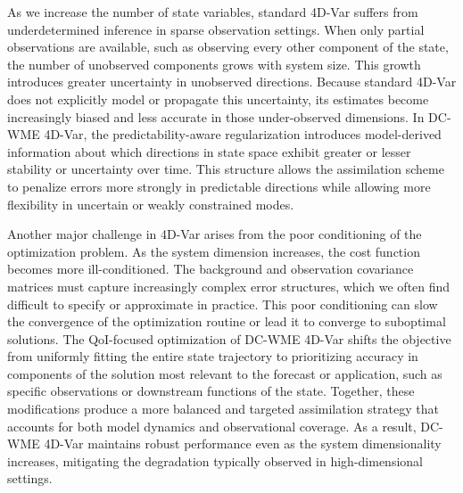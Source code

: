 \documentclass[final,1p,times]{elsarticle}
\begin{document}
As we increase the number of state variables, standard 4D-Var suffers from underdetermined inference in sparse observation settings. 
When only partial observations are available, such as observing every other component of the state, the number of unobserved components grows with system size. 
This growth introduces greater uncertainty in unobserved directions. 
Because standard 4D-Var does not explicitly model or propagate this uncertainty, its estimates become increasingly biased and less accurate in those under-observed dimensions. 
In DC-WME 4D-Var, the predictability-aware regularization introduces model-derived information about which directions in state space exhibit greater or lesser stability or uncertainty over time. 
This structure allows the assimilation scheme to penalize errors more strongly in predictable directions while allowing more flexibility in uncertain or weakly constrained modes. 

Another major challenge in 4D-Var arises from the poor conditioning of the optimization problem. 
As the system dimension increases, the cost function becomes more ill-conditioned. 
The background and observation covariance matrices must capture increasingly complex error structures, which we often find difficult to specify or approximate in practice. 
This poor conditioning can slow the convergence of the optimization routine or lead it to converge to suboptimal solutions.
The QoI-focused optimization of DC-WME 4D-Var shifts the objective from uniformly fitting the entire state trajectory to prioritizing accuracy in components of the solution most relevant to the forecast or application, such as specific observations or downstream functions of the state. 
Together, these modifications produce a more balanced and targeted assimilation strategy that accounts for both model dynamics and observational coverage. 
As a result, DC-WME 4D-Var maintains robust performance even as the system dimensionality increases, mitigating the degradation typically observed in high-dimensional settings.
\end{document}
